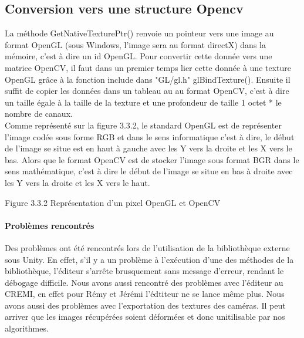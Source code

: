 \documentclass[12pt,a4paper]{report}
\begin{document}
\subsection{Conversion vers une structure Opencv}
La méthode GetNativeTexturePtr() renvoie un pointeur vers une image au format OpenGL (sous Windows, l'image sera au format directX) dans la mémoire, c'est à dire un id OpenGL. Pour convertir cette donnée vers une matrice OpenCV, il faut dans un premier temps lier cette donnée à une texture OpenGL grâce à la fonction include dans "GL/gl.h" glBindTexture(). Ensuite il suffit de copier les données dans un tableau au au format OpenCV, c'est à dire un taille égale à la taille de la texture et une profondeur de taille 1 octet * le nombre de canaux.\\
Comme représenté sur la figure 3.3.2, le standard OpenGL est de représenter l'image codée sous forme RGB et dans le sens informatique c'est à dire, le début de l'image se situe est en haut à gauche avec les Y vers la droite et les X vers le bas. Alors que le format OpenCV est de stocker l'image sous format BGR dans le sens mathématique, c'est à dire le début de l'image se situe en bas à droite avec les Y vers la droite et les X vers le haut.\\

\begin{center}

Figure 3.3.2 Représentation d'un pixel OpenGL et OpenCV
\end{center}

\paragraph{Problèmes rencontrés}
Des problèmes ont été rencontrés lors de l'utilisation de la bibliothèque externe sous Unity. En effet, s'il y a un problème à l'exécution d'une des méthodes de la bibliothèque, l'éditeur s'arrête brusquement sans message d'erreur, rendant le débogage difficile. Nous avons aussi rencontré des problèmes avec l'éditeur au CREMI, en effet pour Rémy et Jérémi l'édtiteur ne se lance même plus. Nous avons aussi des problèmes avec l'exportation des textures des caméras. Il peut arriver que les images récupérées soient déformées et donc unitilisable par nos algorithmes.
\end{document}
